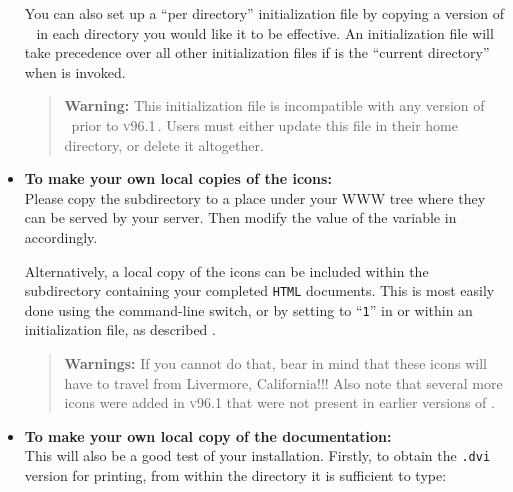 \begin{itemize}
%

You can also set up a ``per directory'' initialization file by 
copying a version of \  in each directory you
would like it to be effective. An initialization file
 will take precedence over all other
initialization files if  is the ``current directory'' when
\latextohtml{} is invoked.

% 
\begin{quotation}\noindent 
\textbf{Warning: }%
This initialization file is incompatible with
any version of \latextohtml\ prior to \textsc{v96.1}\,.  
Users must either update this file in their home directory, 
or delete it altogether.
\end{quotation}

%
\item \label{icondir}%
\textbf{To make your own local copies of the \latextohtml{} icons:} \\
Please copy the  subdirectory to a 
place under your WWW tree
where they can be served by your server.
Then modify the value of the  variable in 
 accordingly.
%
\begin{changebar}%
Alternatively, a local copy of the icons can be included within
the subdirectory containing your completed \texttt{HTML} documents.
This is most easily done using the  command-line switch,
or by setting  to ``\texttt{1}'' in 
or within an initialization file, as described .
\end{changebar}

%
\begin{quotation}\noindent
\textbf{Warnings: }%
If you cannot do that, bear in mind that these icons will have
to travel from Livermore, California!!!
Also note that several more icons were added in \textsc{v96.1}
that were not present in earlier versions of \latextohtml.
\end{quotation}

%
%
\item
\textbf{To make your own local copy of the \latextohtml{}
documentation:} \\
This will also be a good test of your installation. 
%
%
\noindent
Firstly, to obtain the \texttt{.dvi} version for printing,
from within the  directory it is sufficient to type:


\end{itemize}
